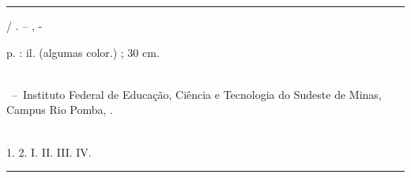 \documentclass[
	12pt,				%
	openright,			%
	oneside,			%
	a4paper,			%
	english,			%
	french,				%
	spanish,			%
	brazil,				%
	]{abntex2}
\begin{document}
%
%     
\begin{fichacatalografica}
	\vspace*{\fill}					%
	\hrule							%
	\begin{center}					%
	\begin{minipage}[c]{12.5cm}		%
	
	\imprimirautor
	
	\hspace{0.5cm} \imprimirtitulo  / \imprimirautor. --
	\imprimirlocal, \imprimirdata-
	
	\hspace{0.5cm} \pageref{LastPage} p. : il. (algumas color.) ; 30 cm.\\
	
	\hspace{0.5cm} \imprimirorientadorRotulo~\imprimirorientador\\
	
	\hspace{0.5cm}
	\parbox[t]{\textwidth}{\imprimirtipotrabalho~--~Instituto Federal de Educação, Ciência e Tecnologia do Sudeste de Minas, Campus Rio Pomba,
	\imprimirdata.}\\
	
	\hspace{0.5cm}
		1. 
		2. 
		I. 
		II.
		III.
		IV. \\ 			
	
	\hspace{8.75cm} %
	
	\end{minipage}
	\end{center}
	\hrule
\end{fichacatalografica}

\end{document}
